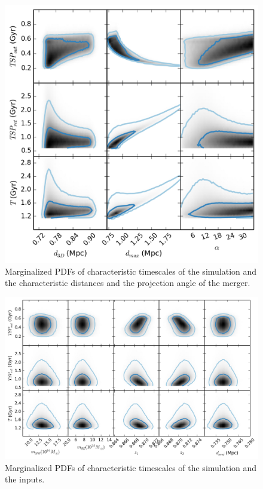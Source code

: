 \documentclass[letterpaper,useAMS,usenatbib]{mn2e}
\begin{document}
\begin{figure}
\begin{minipage}{180mm}
	\begin{center}
	\includegraphics[width=0.5\linewidth]{TwoMnWBSG_timeVsgeo.png}
	\caption{Marginalized PDFs of characteristic timescales of the simulation
and the characteristic distances and the projection angle of the merger. }
	\end{center}
\end{minipage}
\end{figure}
\begin{figure}
\begin{minipage}{180mm}
	\begin{center}
	\includegraphics[width=0.7\linewidth]{TwoMnWBSG_timeVSinput.png}
	\caption{Marginalized PDFs of characteristic timescales of the simulation
and the inputs.}
	\end{center}
\end{minipage}
\end{figure}
\end{document}
